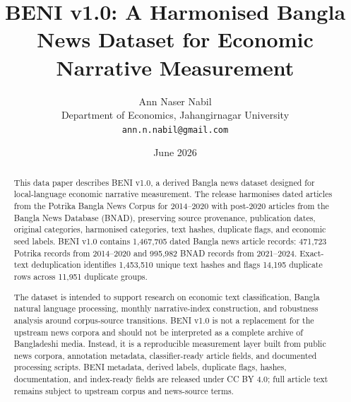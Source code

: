 \documentclass[11pt]{article}
\title{BENI v1.0: A Harmonised Bangla News Dataset for Economic Narrative Measurement}
\author{Ann Naser Nabil\\
Department of Economics, Jahangirnagar University\\
\texttt{ann.n.nabil@gmail.com}}
\date{June 2026}
\begin{document}
\maketitle

\begin{center}
\end{center}

\begin{abstract}
This data paper describes BENI v1.0, a derived Bangla news dataset designed for local-language economic narrative measurement. The release harmonises dated articles from the Potrika Bangla News Corpus for 2014--2020 with post-2020 articles from the Bangla News Database (BNAD), preserving source provenance, publication dates, original categories, harmonised categories, text hashes, duplicate flags, and economic seed labels. BENI v1.0 contains 1,467,705 dated Bangla news article records: 471,723 Potrika records from 2014--2020 and 995,982 BNAD records from 2021--2024. Exact-text deduplication identifies 1,453,510 unique text hashes and flags 14,195 duplicate rows across 11,951 duplicate groups.

The dataset is intended to support research on economic text classification, Bangla natural language processing, monthly narrative-index construction, and robustness analysis around corpus-source transitions. BENI v1.0 is not a replacement for the upstream news corpora and should not be interpreted as a complete archive of Bangladeshi media. Instead, it is a reproducible measurement layer built from public news corpora, annotation metadata, classifier-ready article fields, and documented processing scripts. BENI metadata, derived labels, duplicate flags, hashes, documentation, and index-ready fields are released under CC BY 4.0; full article text remains subject to upstream corpus and news-source terms.
\end{abstract}
\end{document}
